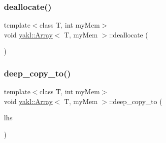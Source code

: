 \mbox{\label{classyakl_1_1Array_af89254334573c3f25b83a15e6d9fbd5d}} 
\subsubsection{\texorpdfstring{deallocate()}{deallocate()}}
{\footnotesize\ttfamily template$<$class T, int my\+Mem$>$ \\
void \hyperlink{classyakl_1_1Array}{yakl\+::\+Array}$<$ T, my\+Mem $>$\+::deallocate (\begin{DoxyParamCaption}{ }\end{DoxyParamCaption})\hspace{0.3cm}{\ttfamily [inline]}}

\mbox{\label{classyakl_1_1Array_a5ecd5d8a795dffe245fcb2a7cfe02749}} 
\subsubsection{\texorpdfstring{deep\+\_\+copy\+\_\+to()}{deep\_copy\_to()}\hspace{0.1cm}{\footnotesize\ttfamily [1/2]}}
{\footnotesize\ttfamily template$<$class T, int my\+Mem$>$ \\
void \hyperlink{classyakl_1_1Array}{yakl\+::\+Array}$<$ T, my\+Mem $>$\+::deep\+\_\+copy\+\_\+to (\begin{DoxyParamCaption}\item[{\hyperlink{classyakl_1_1Array}{Array}$<$ T, \hyperlink{namespaceyakl_aae8a8c910fec7cef7db68c9658c16405}{mem\+Host} $>$}]{lhs }\end{DoxyParamCaption})\hspace{0.3cm}{\ttfamily [inline]}}

\mbox{\label{classyakl_1_1Array_a18be98af68fba9a1fa07f0c23378d56c}} 
